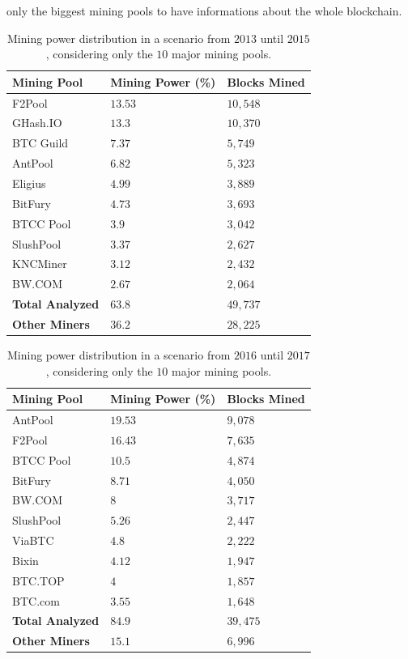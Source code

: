 \documentclass[USenglish]{uit-thesis}
\begin{document}
only the biggest mining pools to have informations
about the whole blockchain. 
\begin{table}
	\centering
	\caption{Mining power distribution in a scenario from $2013$ until $2015$,
		considering only the $10$ major mining pools.}
	\label{tab:miner_share_2015}
	\begin{tabular}{|p{3.3cm}|p{3.3cm}|p{3.3cm}|} \hline
		\textbf{Mining Pool}&\textbf{Mining Power (\%)}& \textbf{Blocks Mined}\\
		\hline
		\rowcolor{F2Pool}
		F2Pool&$13.53$&$10,548$\\
		\hline
		GHash.IO&$13.3$&$10,370$\\
		\hline
		BTC Guild&$7.37$&$5,749$\\
		\hline
		\rowcolor{AntPool}
		AntPool&$6.82$&$5,323$\\
		\hline
		Eligius&$4.99$&$3,889$\\
		\hline
		\rowcolor{BitFury}
		BitFury&$4.73$&$3,693$\\
		\hline
		\rowcolor{BTCC Pool}
		BTCC Pool&$3.9$&$3,042$\\
		\hline
		\rowcolor{SlushPool}
		SlushPool&$3.37$&$2,627$\\
		\hline
		KNCMiner&$3.12$&$2,432$\\
		\hline
		\rowcolor{BW.COM}
		BW.COM&$2.67$&$2,064$\\
		\hline
		\rowcolor{TablesColor}
		\textbf{Total Analyzed}&$63.8$&$49,737$\\
		\hline
		\textbf{Other Miners}&$36.2$&$28,225$\\
		\hline
	\end{tabular}
\end{table}
\begin{table}
	\centering
	\caption{Mining power distribution in a scenario from $2016$ until $2017$,
		considering only the $10$ major mining pools.}
	\label{tab:miner_share_2017}
	\begin{tabular}{|p{3.3cm}|p{3.3cm}|p{3.3cm}|} \hline
		\textbf{Mining Pool}&\textbf{Mining Power (\%)}& \textbf{Blocks Mined}\\
		\hline
		\rowcolor{AntPool}
		AntPool&$19.53$&$9,078$\\
		\hline
		\rowcolor{F2Pool}
		F2Pool&$16.43$&$7,635$\\
		\hline
		\rowcolor{BTCC Pool}
		BTCC Pool&$10.5$&$4,874$\\
		\hline
		\rowcolor{BitFury}
		BitFury&$8.71$&$4,050$\\
		\hline
		\rowcolor{BW.COM}
		BW.COM&$8$&$3,717$\\
		\hline
		\rowcolor{SlushPool}
		SlushPool&$5.26$&$2,447$\\
		\hline
		ViaBTC&$4.8$&$2,222$\\
		\hline
		Bixin&$4.12$&$1,947$\\
		\hline
		BTC.TOP&$4$&$1,857$\\
		\hline
		BTC.com&$3.55$&$1,648$\\
		\hline
		\rowcolor{TablesColor}
		\textbf{Total Analyzed}&$84.9$&$39,475$\\
		\hline
		\textbf{Other Miners}&$15.1$&$6,996$\\
		\hline
	\end{tabular}
\end{table}
\end{document}
